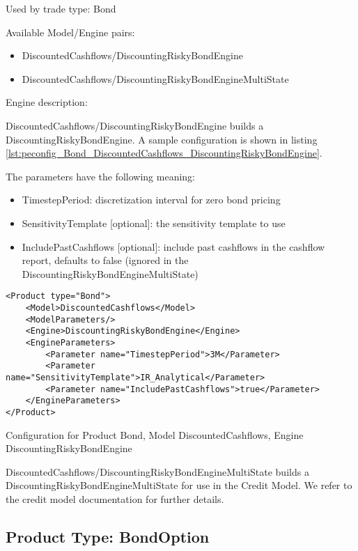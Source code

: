 Used by trade type: Bond

Available Model/Engine pairs:

\begin{itemize}
\item DiscountedCashflows/DiscountingRiskyBondEngine
\item DiscountedCashflows/DiscountingRiskyBondEngineMultiState
\end{itemize}

Engine description:

DiscountedCashflows/DiscountingRiskyBondEngine builds a DiscountingRiskyBondEngine. A sample configuration is shown
in listing \ref{lst:peconfig_Bond_DiscountedCashflows_DiscountingRiskyBondEngine}.

The parameters have the following meaning:

\begin{itemize}
\item TimestepPeriod: discretization interval for zero bond pricing
\item SensitivityTemplate [optional]: the sensitivity template to use 
\item IncludePastCashflows [optional]: include past cashflows in the cashflow report, defaults to false (ignored in the DiscountingRiskyBondEngineMultiState)
\end{itemize}

\begin{longlisting}
\begin{verbatim}
<Product type="Bond">
    <Model>DiscountedCashflows</Model>
    <ModelParameters/>
    <Engine>DiscountingRiskyBondEngine</Engine>
    <EngineParameters>
        <Parameter name="TimestepPeriod">3M</Parameter>
        <Parameter name="SensitivityTemplate">IR_Analytical</Parameter>
        <Parameter name="IncludePastCashflows">true</Parameter>
    </EngineParameters>
</Product>
\end{verbatim}
\caption{Configuration for Product Bond, Model DiscountedCashflows, Engine DiscountingRiskyBondEngine}
\label{lst:peconfig_Bond_DiscountedCashflows_DiscountingRiskyBondEngine}
\end{longlisting}

DiscountedCashflows/DiscountingRiskyBondEngineMultiState builds a DiscountingRiskyBondEngineMultiState for use in the
Credit Model. We refer to the credit model documentation for further details.

\subsection{Product Type: BondOption}

